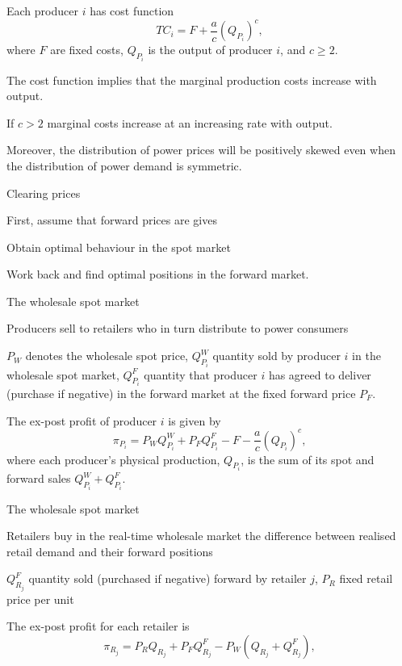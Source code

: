 
	Each producer $i$ has cost function
$$
TC_i=F+\frac{a}{c}(Q_{P_i})^c,
$$
where $F$ are fixed costs, $Q_{P_i}$ is the output of producer $i$, and $c\geq 2$.

	The cost function implies that the marginal production costs increase with output.

	If $c>2$ marginal costs increase at an increasing rate with output.

	Moreover, the distribution of power prices will be positively skewed even when the distribution of power demand is symmetric.


{Clearing prices}


	First, assume that forward prices are gives

	Obtain optimal behaviour in the spot market

	Work back and find optimal positions in the forward market.


{The wholesale spot market}


	Producers sell to retailers who in turn distribute to power consumers

	$P_W$ denotes the wholesale spot price, $Q_{P_i}^W$ quantity sold by producer $i$ in the wholesale spot market, $Q_{P_i}^F$ quantity
that producer $i$ has agreed to deliver (purchase if negative) in the forward market at the fixed forward price $P_F$.

	The ex-post profit of producer $i$ is given by
$$
\pi_{P_i}=P_W Q_{P_i}^W + P_FQ_{P_i}^F
-F-\frac{a}{c}(Q_{P_i})^c,$$
where each producer's physical production, $Q_{P_i}$, is the sum of its spot and forward sales $Q_{P_i}^W+Q_{P_i}^F$.


{The wholesale spot market}


	Retailers buy in the real-time wholesale market the difference between realised retail demand and their forward positions

	$Q_{R_j}^F$ quantity sold (purchased if negative) forward by retailer $j$, $P_R$ fixed retail price per unit

	The ex-post profit for each retailer is
$$
\pi_{R_j}=P_R Q_{R_j} + P_FQ_{R_j}^F - P_W (Q_{R_j}+Q_{R_j}^F),$$

